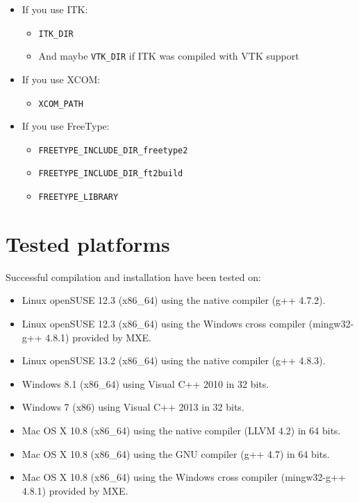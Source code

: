 \documentclass[11pt,oneside,a4paper,final]{article}
\begin{document}
\begin{itemize}
	\item If you use \Gls{ITK}:
	\begin{itemize}
		\item \verb|ITK_DIR|
		\item And maybe \verb|VTK_DIR| if \Gls{ITK} was compiled with \Gls{VTK} support
	\end{itemize}
	
	\item If you use XCOM:
	\begin{itemize}
		\item \verb|XCOM_PATH|
	\end{itemize}

	\item If you use FreeType:
	\begin{itemize}
		\item \verb|FREETYPE_INCLUDE_DIR_freetype2|
		\item \verb|FREETYPE_INCLUDE_DIR_ft2build|
		\item \verb|FREETYPE_LIBRARY|
	\end{itemize}


\end{itemize}


\section{Tested platforms}

Successful compilation and installation have been tested on:

\begin{itemize}
 \item Linux openSUSE 12.3 (x86\_64) using the native compiler (g++ 4.7.2).
 \item Linux openSUSE 12.3 (x86\_64) using the Windows cross compiler (mingw32-g++ 4.8.1) provided by \Gls{MXE}.
 \item Linux openSUSE 13.2 (x86\_64) using the native compiler (g++ 4.8.3).
 \item Windows 8.1 (x86\_64) using Visual C++ 2010 in 32 bits.
 \item Windows 7 (x86) using Visual C++ 2013 in 32 bits.
 \item Mac OS X 10.8 (x86\_64) using the native compiler (LLVM 4.2) in 64 bits.
 \item Mac OS X 10.8 (x86\_64) using the GNU compiler (g++ 4.7) in 64 bits.
 \item Mac OS X 10.8 (x86\_64) using the Windows cross compiler (mingw32-g++ 4.8.1) provided by \Gls{MXE}.
\end{itemize}


\newpage
\printglossary[type=\acronymtype] 

\newpage
{}
{}
\printbibliography
\end{document}
